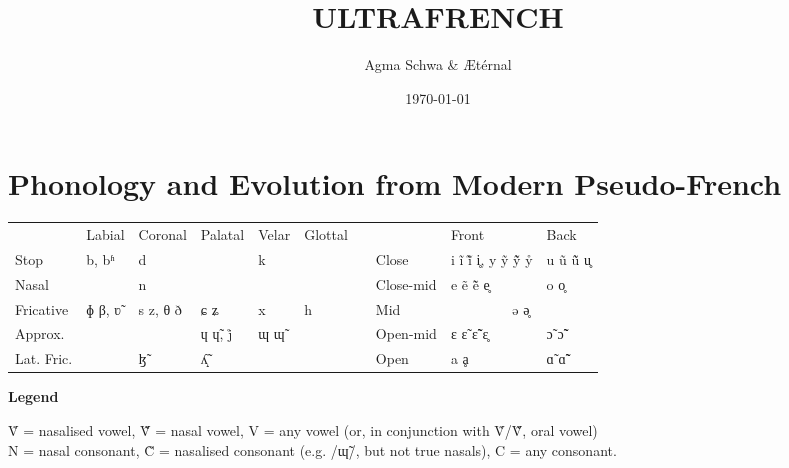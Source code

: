 \documentclass[a4paper, 12pt, oneside, final]{article}
\title{ULTRAFRENCH}
\author{Agma Schwa \& Ætérnal}
\date{\today}
\def\parheading#1{\noindent\textbf{#1}}
\begin{document}
\maketitle
\thispagestyle{empty}
\clearpage
\setcounter{page}{1}

\section{Phonology and Evolution from Modern Pseudo-French}\label{sec:phonology}{\def\arraystretch{1.25}\setlength{\tabcolsep}{.4em}
\noindent\begin{tabular}{@{}|l|l|l|l|l|l|l@{\quad}|l|l|l|}                                                   \cline{1-6} \cline{8-10}
               & Labial & Coronal  & Palatal  & Velar & Glottal &&           & Front        & Back        \\ \cline{1-6} \cline{8-10}
    Stop       & b, bʱ  & d        &          & k     &         && Close     & i ĩ ĩ̃ i̥, y ỹ ỹ̃ ẙ & u ũ ũ̃ u̥ \\ \cline{1-6} \cline{8-10}
    Nasal      &        & n        &          &       &         && Close-mid & e ẽ ẽ̃ e̥      & o o̥         \\ \cline{1-6} \cline{8-10}
    Fricative  & ɸ β, ʋ̃ & s z, θ ð & ɕ ʑ      & x     & h       && Mid       & \multicolumn{2}{c|}{ə ə̥}   \\ \cline{1-6} \cline{8-10}
    Approx.    &        &          & ɥ ɥ̃, j̊   & ɰ ɰ̃   &         && Open-mid  & ɛ ɛ̃ ɛ̃̃ ɛ̥      & ɔ̃ ɔ̃̃         \\ \cline{1-6} \cline{8-10}
    Lat. Fric. &        & ɮ̃        & ʎ̝̃        &       &         && Open      & a ḁ          & ɑ̃ ɑ̃̃         \\ \cline{1-6} \cline{8-10}
\end{tabular}}\bigskip

\parheading{Legend}\par\noindent
Ṽ = nasalised vowel, Ṽ̃ = nasal vowel, V = any vowel (or, in conjunction with Ṽ/Ṽ̃, oral vowel)\\
N = nasal consonant, C̃ = nasalised consonant (e.g. /ɰ̃/, but not true nasals), C = any consonant.\medskip
\end{document}
